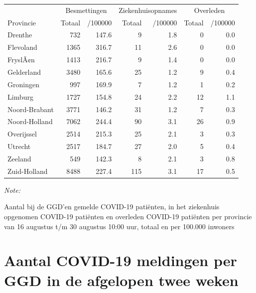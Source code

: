 \documentclass[
  english,
  man,floatsintext]{apa6}
\begin{document}
\begin{table}
\centering
\begin{threeparttable}
\begin{tabular}{lrrrrrr}
\toprule
\multicolumn{1}{c}{ } & \multicolumn{2}{c}{Besmettingen} & \multicolumn{2}{c}{Ziekenhuisopnames} & \multicolumn{2}{c}{Overleden} \\
\cmidrule(l{3pt}r{3pt}){2-3} \cmidrule(l{3pt}r{3pt}){4-5} \cmidrule(l{3pt}r{3pt}){6-7}
Provincie & Totaal & /100000 & Totaal & /100000 & Totaal & /100000\\
\midrule
Drenthe & 732 & 147.6 & 9 & 1.8 & 0 & 0.0\\
Flevoland & 1365 & 316.7 & 11 & 2.6 & 0 & 0.0\\
FryslÃ¢n & 1413 & 216.7 & 9 & 1.4 & 0 & 0.0\\
Gelderland & 3480 & 165.6 & 25 & 1.2 & 9 & 0.4\\
Groningen & 997 & 169.9 & 7 & 1.2 & 1 & 0.2\\
Limburg & 1727 & 154.8 & 24 & 2.2 & 12 & 1.1\\
Noord-Brabant & 3771 & 146.2 & 31 & 1.2 & 7 & 0.3\\
Noord-Holland & 7062 & 244.4 & 90 & 3.1 & 26 & 0.9\\
Overijssel & 2514 & 215.3 & 25 & 2.1 & 3 & 0.3\\
Utrecht & 2517 & 184.7 & 27 & 2.0 & 5 & 0.4\\
Zeeland & 549 & 142.3 & 8 & 2.1 & 3 & 0.8\\
Zuid-Holland & 8488 & 227.4 & 115 & 3.1 & 17 & 0.5\\
\bottomrule
\end{tabular}
\begin{tablenotes}
\item \textit{Note: } 
\item Aantal bij de GGD’en gemelde COVID-19 patiënten, in het ziekenhuis opgenomen COVID-19 patiënten en overleden COVID-19 patiënten per provincie van 16 augustus t/m 30 augustus 10:00 uur, totaal en per 100.000 inwoners
\end{tablenotes}
\end{threeparttable}
\end{table}

\newpage

\hypertarget{aantal-covid-19-meldingen-per-ggd-in-de-afgelopen-twee-weken}{%
\section{Aantal COVID-19 meldingen per GGD in de afgelopen twee weken}\label{aantal-covid-19-meldingen-per-ggd-in-de-afgelopen-twee-weken}}
\end{document}
